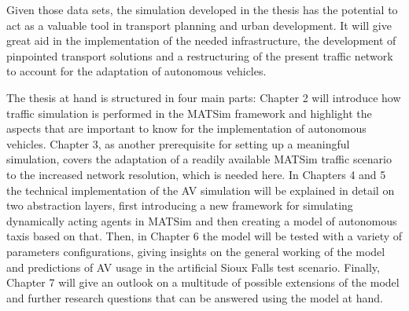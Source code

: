 Given those data sets, the simulation developed in the thesis has the potential
to act as a valuable tool in transport planning and urban development. It will give
great aid in the implementation of the needed infrastructure, the development of
pinpointed transport solutions and a restructuring of the present traffic network
to account for the adaptation of autonomous vehicles.

The thesis at hand is structured in four main parts: Chapter 2 will introduce how
traffic simulation is performed in the MATSim framework and highlight the aspects
that are important to know for the implementation of autonomous vehicles. Chapter 3,
as another prerequisite for setting up a meaningful simulation, covers the adaptation
of a readily available MATSim traffic scenario to the increased network resolution,
which is needed here. In Chapters 4 and 5 the technical implementation
of the AV simulation will be explained in detail on two abstraction layers, first
introducing a new framework for simulating dynamically acting agents in MATSim
and then creating a model of autonomous taxis based on that. Then, in Chapter 6
the model will be tested with a variety of parameters configurations, giving
insights on the general working of the model and predictions of AV usage in the
artificial Sioux Falls test scenario. Finally, Chapter 7 will give an outlook on
a multitude of possible extensions of the model and further research questions that
can be answered using the model at hand.
